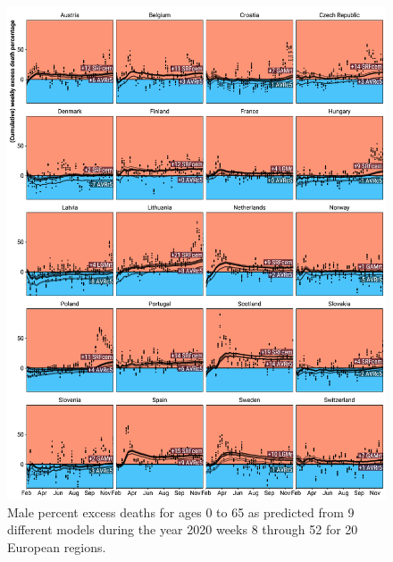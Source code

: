 \documentclass[12pt]{article}
\begin{document}
\begin{appendix}
\begin{figure}
\caption{
Male percent excess deaths for ages 0 to 65 as predicted from 9 different models during the year 2020 weeks 8 through 52 for 20 European regions.}
\label{fig:excessm0to65}
\includegraphics{excess_male__0_65_.pdf}
\end{figure}


\end{appendix}
\end{document}
